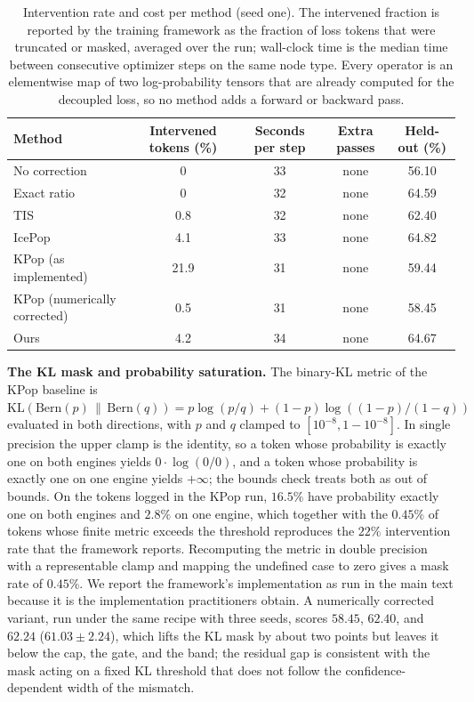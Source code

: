 \begin{table}[h]
\centering
\caption{Intervention rate and cost per method (seed one). The intervened fraction is reported by the training framework as the fraction of loss tokens that were truncated or masked, averaged over the run; wall-clock time is the median time between consecutive optimizer steps on the same node type. Every operator is an elementwise map of two log-probability tensors that are already computed for the decoupled loss, so no method adds a forward or backward pass.}
\label{tab:overhead}
\small\setlength{\tabcolsep}{4pt}
\begin{tabular}{lcccc}
\toprule
Method & Intervened tokens (\%) & Seconds per step & Extra passes & Held-out (\%) \\
\midrule
No correction & 0 & 33 & none & 56.10 \\
Exact ratio & 0 & 32 & none & 64.59 \\
TIS & 0.8 & 32 & none & 62.40 \\
IcePop & 4.1 & 33 & none & 64.82 \\
KPop (as implemented) & 21.9 & 31 & none & 59.44 \\
KPop (numerically corrected) & 0.5 & 31 & none & 58.45 \\
Ours & 4.2 & 34 & none & 64.67 \\
\bottomrule
\end{tabular}
\end{table}

\noindent\textbf{The KL mask and probability saturation.}
The binary-KL metric of the KPop baseline is $\mathrm{KL}(\mathrm{Bern}(p)\,\|\,\mathrm{Bern}(q))=p\log(p/q)+(1-p)\log((1-p)/(1-q))$ evaluated in both directions, with $p$ and $q$ clamped to $[10^{-8},1-10^{-8}]$. In single precision the upper clamp is the identity, so a token whose probability is exactly one on both engines yields $0\cdot\log(0/0)$, and a token whose probability is exactly one on one engine yields $+\infty$; the bounds check treats both as out of bounds. On the tokens logged in the KPop run, $16.5\%$ have probability exactly one on both engines and $2.8\%$ on one engine, which together with the $0.45\%$ of tokens whose finite metric exceeds the threshold reproduces the $22\%$ intervention rate that the framework reports. Recomputing the metric in double precision with a representable clamp and mapping the undefined case to zero gives a mask rate of $0.45\%$. We report the framework's implementation as run in the main text because it is the implementation practitioners obtain. A numerically corrected variant, run under the same recipe with three seeds, scores $58.45$, $62.40$, and $62.24$ ($61.03\pm2.24$), which lifts the KL mask by about two points but leaves it below the cap, the gate, and the band; the residual gap is consistent with the mask acting on a fixed KL threshold that does not follow the confidence-dependent width of the mismatch.

